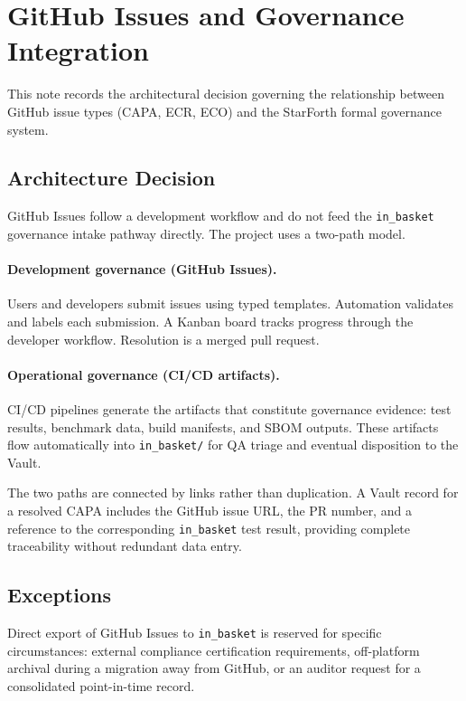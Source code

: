 
\section{GitHub Issues and Governance Integration}

This note records the architectural decision governing the relationship between GitHub
issue types (CAPA, ECR, ECO) and the StarForth formal governance system.

\subsection{Architecture Decision}

GitHub Issues follow a development workflow and do not feed the \texttt{in\_basket}
governance intake pathway directly. The project uses a two-path model.

\paragraph{Development governance (GitHub Issues).}
Users and developers submit issues using typed templates. Automation validates and
labels each submission. A Kanban board tracks progress through the developer workflow.
Resolution is a merged pull request.

\paragraph{Operational governance (CI/CD artifacts).}
CI/CD pipelines generate the artifacts that constitute governance evidence: test
results, benchmark data, build manifests, and SBOM outputs. These artifacts flow
automatically into \texttt{in\_basket/} for QA triage and eventual disposition to
the Vault.

The two paths are connected by links rather than duplication. A Vault record for a
resolved CAPA includes the GitHub issue URL, the PR number, and a reference to the
corresponding \texttt{in\_basket} test result, providing complete traceability without
redundant data entry.

\subsection{Exceptions}

Direct export of GitHub Issues to \texttt{in\_basket} is reserved for specific
circumstances: external compliance certification requirements, off-platform archival
during a migration away from GitHub, or an auditor request for a consolidated
point-in-time record.

